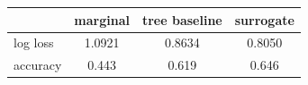 \begin{tabular}{lccc}
\toprule
 & marginal & tree baseline & surrogate \\
\midrule
log loss & 1.0921 & 0.8634 & 0.8050 \\
accuracy & 0.443 & 0.619 & 0.646 \\
\bottomrule
\end{tabular}
